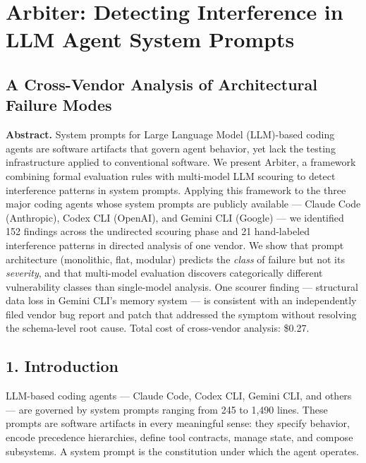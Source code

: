 \documentclass[
]{article}
\author{}
\date{}
\begin{document}
\hypertarget{arbiter-detecting-interference-in-llm-agent-system-prompts}{%
\section{Arbiter: Detecting Interference in LLM Agent System
Prompts}\label{arbiter-detecting-interference-in-llm-agent-system-prompts}}

\hypertarget{a-cross-vendor-analysis-of-architectural-failure-modes}{%
\subsection{A Cross-Vendor Analysis of Architectural Failure
Modes}\label{a-cross-vendor-analysis-of-architectural-failure-modes}}

\textbf{Abstract.} System prompts for Large Language Model (LLM)-based
coding agents are software artifacts that govern agent behavior, yet
lack the testing infrastructure applied to conventional software. We
present Arbiter, a framework combining formal evaluation rules with
multi-model LLM scouring to detect interference patterns in system
prompts. Applying this framework to the three major coding agents whose
system prompts are publicly available --- Claude Code (Anthropic), Codex
CLI (OpenAI), and Gemini CLI (Google) --- we identified 152 findings
across the undirected scouring phase and 21 hand-labeled interference
patterns in directed analysis of one vendor. We show that prompt
architecture (monolithic, flat, modular) predicts the \emph{class} of
failure but not its \emph{severity}, and that multi-model evaluation
discovers categorically different vulnerability classes than
single-model analysis. One scourer finding --- structural data loss in
Gemini CLI's memory system --- is consistent with an independently filed
vendor bug report and patch that addressed the symptom without resolving
the schema-level root cause. Total cost of cross-vendor analysis:
\$0.27.

\hypertarget{introduction}{%
\subsection{1. Introduction}\label{introduction}}

LLM-based coding agents --- Claude Code, Codex CLI, Gemini CLI, and
others --- are governed by system prompts ranging from 245 to 1,490
lines. These prompts are software artifacts in every meaningful sense:
they specify behavior, encode precedence hierarchies, define tool
contracts, manage state, and compose subsystems. A system prompt is the
constitution under which the agent operates.
\end{document}
